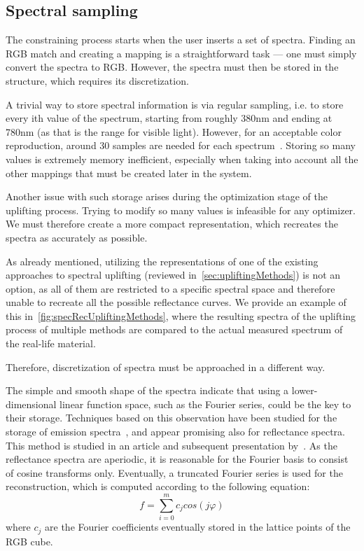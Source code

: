 \subsection{Spectral sampling}

The constraining process starts when the user inserts a set of spectra. Finding an RGB match and creating a mapping is a straightforward task --- one must simply convert the spectra to RGB. However, the spectra must then be stored in the structure, which requires its discretization.

A trivial way to store spectral information is via regular sampling, i.e. to store every ith value of the spectrum, starting from roughly 380nm and ending at 780nm (as that is the range for visible light). However, for an acceptable color reproduction, around 30 samples are needed for each spectrum~\cite{trigonometricMomentsPresentation}. Storing so many values is extremely memory inefficient, especially when taking into account all the other mappings that must be created later in the system.

Another issue with such storage arises during the optimization stage of the uplifting process. Trying to modify so many values is infeasible for any optimizer. We must therefore create a more compact representation, which recreates the spectra as accurately as possible.

As already mentioned, utilizing the representations of one of the existing approaches to spectral uplifting (reviewed in~\cref{sec:upliftingMethods}) is not an option, as all of them are restricted to a specific spectral space and therefore unable to recreate all the possible reflectance curves. We provide an example of this in~\cref{fig:specRecUpliftingMethods}, where the resulting spectra of the uplifting process of multiple methods are compared to the actual measured spectrum of the real-life material.

Therefore, discretization of spectra must be approached in a different way.

The simple and smooth shape of the spectra indicate that using a lower-dimensional linear function space, such as the Fourier series, could be the key to their storage. Techniques based on this observation have been studied for the storage of emission spectra~\cite{fourierRepresEmission}, and appear promising also for reflectance spectra. This method is studied in an article and subsequent presentation by~\citet{trigonometricMomentsPresentation}. As the reflectance spectra are aperiodic, it is reasonable for the Fourier basis to consist of cosine transforms only. Eventually, a truncated Fourier series is used for the reconstruction, which is computed according to the following equation:
\begin{equation} \label{truncatedFourierSeries}
  f = \sum_{i=0}^{m}c_j cos(j\varphi)
\end{equation}
where $c_j$ are the Fourier coefficients eventually stored in the lattice points of the RGB cube.

